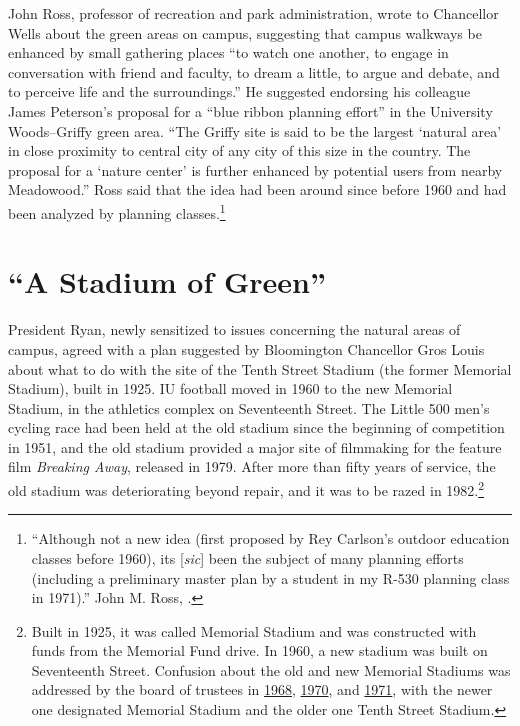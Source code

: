 \documentclass[
  american,
  letterpaper,
]{scrreprt}
\begin{document}
John Ross, professor of recreation and park administration, wrote to
Chancellor Wells about the green areas on campus, suggesting that campus
walkways be enhanced by small gathering places ``to watch one another,
to engage in conversation with friend and faculty, to dream a little, to
argue and debate, and to perceive life and the surroundings.'' He
suggested endorsing his colleague James Peterson's proposal for a ``blue
ribbon planning effort'' in the University Woods--Griffy green area.
``The Griffy site is said to be the largest `natural area' in close
proximity to central city of any city of this size in the country. The
proposal for a `nature center' is further enhanced by potential users
from nearby Meadowood.'' Ross said that the idea had been around since
before 1960 and had been analyzed by planning classes.\footnote{``Although
  not a new idea (first proposed by Rey Carlson's outdoor education
  classes before 1960), its {[}\emph{sic}{]} been the subject of many
  planning efforts (including a preliminary master plan by a student in
  my R-530 planning class in 1971).'' John M. Ross,
  .}

\section{``A Stadium of Green''}\label{a-stadium-of-green}

President Ryan, newly sensitized to issues concerning the natural areas
of campus, agreed with a plan suggested by Bloomington Chancellor Gros
Louis about what to do with the site of the Tenth Street Stadium (the
former Memorial Stadium), built in 1925. IU football moved in 1960 to
the new Memorial Stadium, in the athletics complex on Seventeenth
Street. The Little 500 men's cycling race had been held at the old
stadium since the beginning of competition in 1951, and the old stadium
provided a major site of filmmaking for the feature film \emph{Breaking
Away}, released in 1979. After more than fifty years of service, the old
stadium was deteriorating beyond repair, and it was to be razed in
1982.\footnote{Built in 1925, it was called Memorial Stadium and was
  constructed with funds from the Memorial Fund drive. In 1960, a new
  stadium was built on Seventeenth Street. Confusion about the old and
  new Memorial Stadiums was addressed by the board of trustees in
  \href{https://purl.dlib.indiana.edu/iudl/archives/iubot/1968-11-15}{1968},
  \href{https://purl.dlib.indiana.edu/iudl/archives/iubot/1970-04-25}{1970},
  and
  \href{https://purl.dlib.indiana.edu/iudl/archives/iubot/1971-08-14}{1971},
  with the newer one designated Memorial Stadium and the older one Tenth
  Street Stadium.}
\end{document}
